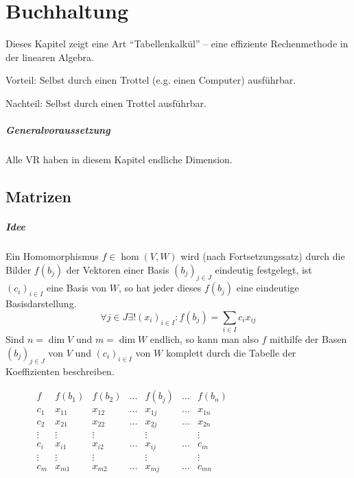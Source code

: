 \chapter{Buchhaltung}
	Dieses Kapitel zeigt eine Art "`Tabellenkalkül"' -- eine effiziente Rechenmethode in der linearen Algebra.
	
	Vorteil: Selbst durch einen Trottel (e.g. einen Computer) ausführbar. 
	
	Nachteil: Selbst durch einen Trottel ausführbar.
	
\paragraph{Generalvoraussetzung} Alle VR haben in diesem Kapitel endliche Dimension.
\section{Matrizen}
\paragraph{Idee}
	Ein Homomorphismus $ f\in \hom(V,W) $ wird (nach Fortsetzungssatz) durch die Bilder $ f(b_j) $ der Vektoren einer Basis $ (b_j)_{j\in J} $ eindeutig festgelegt, ist $ (c_i)_{i\in I} $ eine Basis von $ W $, so hat jeder dieses $ f(b_j) $ eine eindeutige Basisdarstellung.
		\[ \forall {j\in J}\exists! (x_i)_{i\in I}:f(b_j) = \sum_{i\in I}c_ix_{ij} \]
	Sind $ n=\dim V $ und $ m=\dim W $ endlich, so kann man also $ f $ mithilfe der Basen $ (b_j)_{j\in J} $ von $ V $ und $ (c_i)_{i\in I} $ von $ W $ komplett durch die Tabelle der Koeffizienten beschreiben.
	
	\begin{figure}[H]\centering
		$ \begin{array}{c|cccccc}
		f		& f(b_1) 	& f(b_2) 	& \dots 	& f(b_j)	& \dots	& f(b_n) \\\hline
		c_1  	& x_{11}  	& x_{12}	& \dots		& x_{1j}	& \dots	& x_{1n} \\
		c_2		& x_{21}	& x_{22}	& \dots		& x_{2j}	& \dots	& x_{2n} \\
		\vdots  &  \vdots	&  \vdots	&			&  \vdots	&		&  \vdots \\
		c_i		&  x_{i1}	&  x_{i2}	& \dots		&  x_{ij}	&\dots  &  c_{in} \\
		\vdots	&  \vdots	&  \vdots	&			&  \vdots	&		&  \vdots \\
		c_m		&  x_{m1}	&  x_{m2}	& \dots		&  x_{mj}	& \dots	&  c_{mn} 
		\end{array} $
	\end{figure}
	
